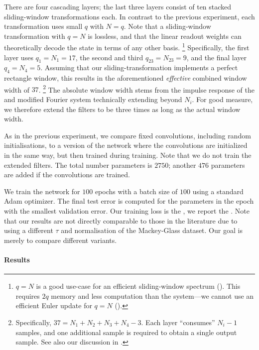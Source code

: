 There are four cascading \LMU layers; the last three layers consist of ten stacked sliding-window transformations each.
In contrast to the previous experiment, each transformation uses small $q$ with $N = q$.
Note that a sliding-window transformation with $q = N$ is lossless, and that the linear readout weights can theoretically decode the state in terms of any other basis.%
\footnote{$q = N$ is a good use-case for an efficient sliding-window spectrum ().
This requires $2q$ memory and less computation than the \LDN system---we cannot use an efficient Euler update for $q = N$ ().}
Specifically, the first \LMU layer uses $q_1 = N_1 = 17$, the second and third $q_{23} = N_{23} = 9$, and the final layer $q_{4} = N_4 = 5$.
Assuming that our sliding-transformation implements a perfect rectangle window, this results in the aforementioned \emph{effective} combined window width of $37$.%
\footnote{Specifically, $37 = N_1 + N_2 + N_3 + N_4 - 3$. Each layer \enquote{consumes} $N_i - 1$ samples, and one additional sample is required to obtain a single output sample. See also our discussion in .}
The absolute window width stems from the impulse response of the \LDN and modified Fourier system technically extending beyond $N_i$.
For good measure, we therefore extend the \FIR filters to be three times as long as the actual window width.

As in the previous experiment, we compare fixed convolutions, including random initialisations, to a version of the network where the convolutions are initialized in the same way, but then trained during training.
Note that we do not train the extended filters.
The total number parameters is $2750$; another $476$ parameters are added if the convolutions are trained.

We train the network for $100$ epochs with a batch size of $100$ using a standard Adam optimizer.
The final test error is computed for the parameters in the epoch with the smallest validation error.
Our training loss is the \MSE, we report the \NRMSE.
Note that our results are not directly comparable to those in the literature due to using a different $\tau$ and normalisation of the Mackey-Glass dataset.
Our goal is merely to compare different \LMU variants.

\paragraph{Results}

